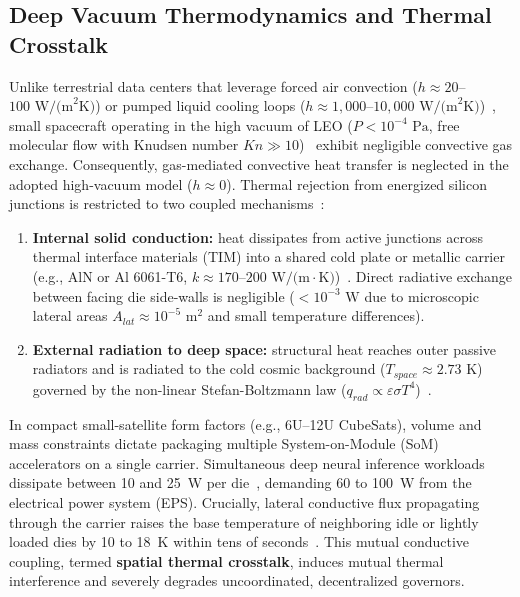 \documentclass[a4paper,fleqn]{cas-dc}
\begin{document}
\subsection{Deep Vacuum Thermodynamics and Thermal Crosstalk}
Unlike terrestrial data centers that leverage forced air convection ($h \approx 20$--$100\text{ W/(m}^2\text{K)}$) or pumped liquid cooling loops ($h \approx 1,000$--$10,000\text{ W/(m}^2\text{K)}$)~\citep{incropera2011fundamentals}, small spacecraft operating in the high vacuum of LEO ($P < 10^{-4}\text{ Pa}$, free molecular flow with Knudsen number $Kn \gg 10$)~\citep{gilmore2002handbook} exhibit negligible convective gas exchange. Consequently, gas-mediated convective heat transfer is neglected in the adopted high-vacuum model ($h \approx 0$). Thermal rejection from energized silicon junctions is restricted to two coupled mechanisms~\citep{ecss2008thermal, gilmore2002handbook}:
\begin{enumerate}
\item \textbf{Internal solid conduction:} heat dissipates from active junctions across thermal interface materials (TIM) into a shared cold plate or metallic carrier (e.g., AlN or Al 6061-T6, $k \approx 170\text{--}200\text{ W/(m}\cdot\text{K)}$)~\citep{ecss2008thermal}. Direct radiative exchange between facing die side-walls is negligible ($< 10^{-3}\text{ W}$ due to microscopic lateral areas $A_{lat} \approx 10^{-5}\text{ m}^2$ and small temperature differences).
\item \textbf{External radiation to deep space:} structural heat reaches outer passive radiators and is radiated to the cold cosmic background ($T_{space} \approx 2.73\text{ K}$) governed by the non-linear Stefan-Boltzmann law ($q_{rad} \propto \varepsilon \sigma T^4$)~\citep{incropera2011fundamentals, pederson2024radiator}.
\end{enumerate}

In compact small-satellite form factors (e.g., 6U--12U CubeSats), volume and mass constraints dictate packaging multiple System-on-Module (SoM) accelerators on a single carrier. Simultaneous deep neural inference workloads dissipate between 10 and 25~W per die~\citep{reuther2022accelerator, kang2025power}, demanding 60 to 100~W from the electrical power system (EPS). Crucially, lateral conductive flux propagating through the carrier raises the base temperature of neighboring idle or lightly loaded dies by 10 to 18~K within tens of seconds~\citep{chen2026hotai, wang2025packaging}. This mutual conductive coupling, termed \textbf{spatial thermal crosstalk}, induces mutual thermal interference and severely degrades uncoordinated, decentralized governors.
\end{document}
